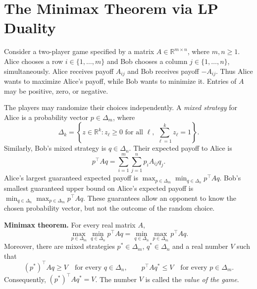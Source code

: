 \documentclass[10pt,letterpaper]{article}
\begin{document}
\section{The Minimax Theorem via LP Duality}
Consider a two-player game specified by a matrix $A\in\mathbb{R}^{m\times n}$,
where $m,n\geq 1$. Alice chooses a row $i\in\{1,\ldots,m\}$ and Bob chooses
a column $j\in\{1,\ldots,n\}$, simultaneously. Alice receives payoff $A_{ij}$
and Bob receives payoff $-A_{ij}$. Thus Alice wants to maximize Alice's
payoff, while Bob wants to minimize it. Entries of $A$ may be positive,
zero, or negative.

The players may randomize their choices independently. A \emph{mixed strategy}
for Alice is a probability vector $p\in\Delta_m$, where
\[
\Delta_k=\left\{z\in\mathbb{R}^k:z_\ell\geq 0\text{ for all }\ell,
\ \sum_{\ell=1}^k z_\ell=1\right\}.
\]
Similarly, Bob's mixed strategy is $q\in\Delta_n$. Their expected payoff
to Alice is
\[
p^\top A q=\sum_{i=1}^m\sum_{j=1}^n p_i A_{ij}q_j.
\]
Alice's largest guaranteed expected payoff is
$\max_{p\in\Delta_m}\min_{q\in\Delta_n}p^\top A q$.
Bob's smallest guaranteed upper bound on Alice's expected payoff is
$\min_{q\in\Delta_n}\max_{p\in\Delta_m}p^\top A q$.
These guarantees allow an opponent to know the chosen probability vector,
but not the outcome of the random choice.

\medskip
\noindent\textbf{Minimax theorem.} For every real matrix $A$,
\[
\boxed{
\max_{p\in\Delta_m}\min_{q\in\Delta_n}p^\top A q
=
\min_{q\in\Delta_n}\max_{p\in\Delta_m}p^\top A q.
}
\]
Moreover, there are mixed strategies $p^*\in\Delta_m$, $q^*\in\Delta_n$
and a real number $V$ such that
\[
(p^*)^\top A q\geq V\quad\text{for every }q\in\Delta_n,
\qquad
p^\top A q^*\leq V\quad\text{for every }p\in\Delta_m.
\]
Consequently, $(p^*)^\top A q^*=V$. The number $V$ is called the
\emph{value of the game}.
\end{document}

